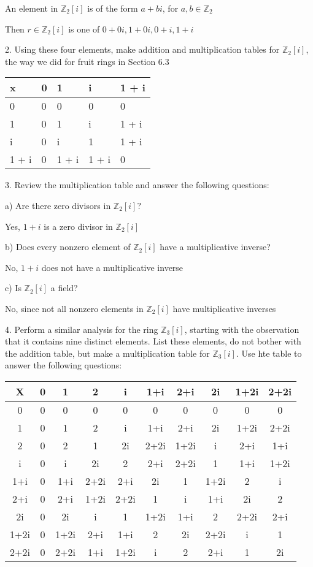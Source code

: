 \documentclass[12pt]{article}
\begin{document}
\begin{itemize}
	An element in $\mathbb{Z}_2[i]$ is of the form $a + bi$, for $a, b \in \mathbb{Z}_2$

	Then $r \in \mathbb{Z}_2[i]$ is one of $0+0i , 1+0i, 0+i, 1+ i$

2. Using these four elements, make addition and multiplication tables for $\mathbb{Z}_2[i]$, the way we did for fruit rings in Section 6.3

\begin{tabular}{l|l l l l}

x 		& 0 & 1 		& i 		& 1 + i\\

\hline

0			& 0	& 0 		& 0 		& 0\\

1			& 0	& 1 		& i 		& 1 + i\\

i			& 0	&	i			&	1 		& 1 + i\\
1 + i & 0 & 1 + i & 1 + i & 0\\
\end{tabular}

3. Review the multiplication table and answer the following questions:

a) Are there zero divisors in $\mathbb{Z}_2[i]?$

Yes, $1 + i$ is a zero divisor in $\mathbb{Z}_2[i]$

b) Does every nonzero element of $\mathbb{Z}_2[i]$ have a multiplicative inverse?

No, $1+i$ does not have a multiplicative inverse

c) Is $\mathbb{Z}_2[i]$ a field?

No, since not all nonzero elements in $\mathbb{Z}_2[i]$ have multiplicative inverses

4. Perform a similar analysis for the ring $\mathbb{Z}_3[i]$, starting with the observation that it contains nine distinct elements. List these elements, do not bother with the addition table, but make a multiplication table for $\mathbb{Z}_3[i]$. Use hte table to answer the following questions:

\begin{tabular}{c|ccccccccc}
\hline 
	X & 0 & 1 & 2 & i & 1+i & 2+i & 2i & 1+2i & 2+2i \\ 
\hline 
	0 & 0 & 0 & 0 & 0 & 0 & 0 & 0 & 0 & 0 \\
1 & 0 & 1 & 2 & i & 1+i & 2+i & 2i & 1+2i & 2+2i \\  
2 & 0 & 2 & 1 & 2i & 2+2i & 1+2i & i & 2+i & 1+i \\ 
i & 0 & i & 2i & 2 & 2+i & 2+2i & 1 & 1+i & 1+2i \\  
1+i & 0 & 1+i & 2+2i & 2+i & 2i & 1 & 1+2i & 2 & i \\  
2+i & 0 & 2+i & 1+2i & 2+2i & 1 & i & 1+i & 2i & 2 \\  
2i & 0 & 2i & i & 1 & 1+2i & 1+i & 2 & 2+2i & 2+i \\  
1+2i & 0 & 1+2i & 2+i & 1+i & 2 & 2i & 2+2i & i & 1 \\  
2+2i & 0 & 2+2i & 1+i & 1+2i & i & 2 & 2+i & 1 & 2i \\  
\end{tabular}


\end{itemize}
\end{document}
